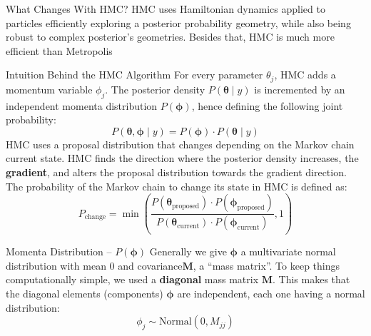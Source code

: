 \begin{frame}{What Changes With HMC?}
	HMC uses Hamiltonian dynamics applied to particles efficiently exploring
	a posterior probability geometry,
	while also being robust to complex posterior's geometries.
	\vfill
	Besides that, HMC is much more efficient than Metropolis
\end{frame}

\begin{frame}{Intuition Behind the HMC Algorithm}
	\small
	For every parameter $\theta_j$, HMC adds a momentum variable $\phi_j$.
	The posterior density $P(\boldsymbol{\theta} \mid y)$ is incremented by an
	independent momenta distribution $P(\boldsymbol{\phi})$,
	hence defining the following joint probability:
	$$
		P(\boldsymbol{\theta}, \boldsymbol{\phi} \mid y) = P(\boldsymbol{\phi}) \cdot P(\boldsymbol{\theta} \mid y)
	$$
	\small
	HMC uses a proposal distribution that changes depending on the Markov chain current state.
	HMC finds the direction where the posterior density increases,
	the \textbf{gradient},
	and alters the proposal distribution towards the gradient direction.
	\vfill
	The probability of the Markov chain to change its state in HMC is defined as:
	$$
		P_{\text{change}} = \min\left({\frac{P(\boldsymbol{\theta}_{\text{proposed}}) \cdot P(\boldsymbol{\phi}_{\text{proposed}})}{P(\boldsymbol{\theta}_{\text{current}})\cdot P(\boldsymbol{\phi}_{\text{current}})}}, 1\right)
	$$
\end{frame}

\begin{frame}{Momenta Distribution -- $P(\boldsymbol{\phi})$}
	Generally we give $\boldsymbol{\phi}$ a multivariate normal distribution
	with mean $0$ and covariance$\mathbf{M}$,
	a ``mass matrix''.
	\vfill
	To keep things computationally simple,
	we used a \textbf{diagonal} mass matrix $\mathbf{M}$.
	This makes that the diagonal elements (components) $\boldsymbol{\phi}$ are independent,
	each one having a normal distribution:
	$$\phi_j \sim \text{Normal}(0, M_{jj})$$
\end{frame}

